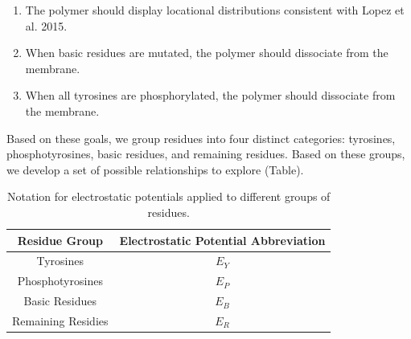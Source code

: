 \documentclass[../../AdvancementSummary.tex]{subfiles}
\begin{document}
\begin{enumerate}
	\item The polymer should display locational distributions consistent with Lopez et al. 2015. \cite{Lopez2015}
	\item When basic residues are mutated, the polymer should dissociate from the membrane.
	\item When all tyrosines are phosphorylated, the polymer should dissociate from the membrane.
\end{enumerate}

Based on these goals, we group residues into four distinct categories: tyrosines, phosphotyrosines, basic residues, and remaining residues. Based on these groups, we develop a set of possible relationships to explore (Table).  

\begin{table}[H]
\caption{Notation for electrostatic potentials applied to different groups of residues. \label{table: ElecPotentialNotation}}
\begin{center}
\begin{tabular}{ c | c}
\hline
Residue Group & Electrostatic Potential Abbreviation \\
\hline
Tyrosines & $E_Y$ \\
Phosphotyrosines & $E_P$ \\
Basic Residues & $E_B$ \\
Remaining Residies & $E_R$ \\
\hline
\end{tabular}
\end{center}
\end{table}
\end{document}
